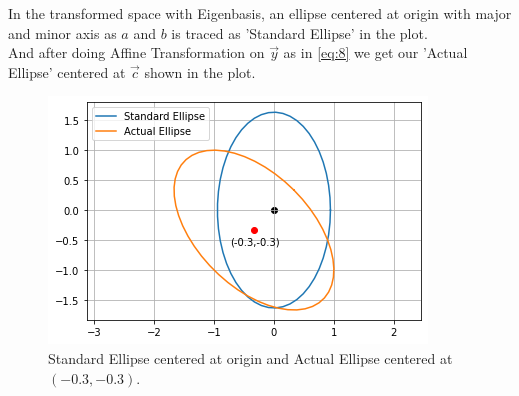 \documentclass[journal,12pt,twocolumn]{IEEEtran}
\begin{document}
In the transformed space with Eigenbasis, an ellipse centered at origin with major and minor axis as $a$ and $b$ is traced as 'Standard Ellipse' in the plot.\\


And after doing Affine Transformation on $\vec{y}$ as in \eqref{eq:8} we get our 'Actual Ellipse' centered at $\vec{c}$ shown in the plot.
\begin{figure}[h]
\centering
    \includegraphics[width=\columnwidth]{ellipse.png}
    \caption{Standard Ellipse centered at origin and Actual Ellipse centered at $(-0.3,-0.3)$.}
    \label{tangent}
\end{figure}
\end{document}
